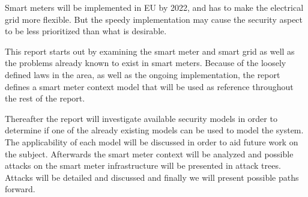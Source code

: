 Smart meters will be implemented in EU by 2022, and has to make the electrical grid more flexible.
But the speedy implementation may cause the security aspect to be less prioritized than what is desirable.

This report starts out by examining the smart meter and smart grid as well as the problems already known to exist in smart meters.
Because of the loosely defined laws in the area, as well as the ongoing implementation, the report defines a smart meter context model that will be used as reference throughout the rest of the report.

Thereafter the report will investigate available security models in order to determine if one of the already existing models can be used to model the system.
The applicability of each model will be discussed in order to aid future work on the subject.
Afterwards the smart meter context will be analyzed and possible attacks on the smart meter infrastructure will be presented in attack trees.
Attacks will be detailed and discussed and finally we will present possible paths forward.